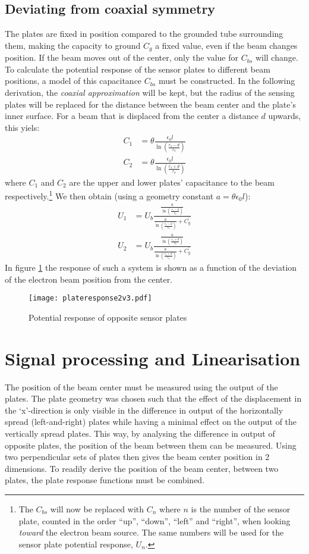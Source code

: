 \subsection{Deviating from coaxial symmetry}
\label{sec:theory/deviating}
The plates are fixed in position compared to the grounded tube surrounding them, making the capacity to ground $C_g$ a fixed value, even if the beam changes position. If the beam moves out of the center, only the value for $C_{bs}$ will change.
To calculate the potential response of the sensor plates to different beam positions, a model of this capacitance $C_{bs}$ must be constructed. 
In the following derivation, the \textit{coaxial approximation} will be kept, but the radius of the sensing plates will be replaced for the distance between the beam center and the plate's inner surface. For a beam that is displaced from the center a distance $d$ upwards, this yiels:
\begin{align}
C_1 &= \theta \frac{\epsilon_0l}{\ln\left(\frac{r_s-d}{r_b}\right)} \\
C_2 &= \theta \frac{\epsilon_0l}{\ln\left(\frac{r_s+d}{r_b}\right)}
\end{align}
where $C_1$ and $C_2$ are the upper and lower plates' capacitance to the beam respectively.\footnote{The $C_{bs}$ will now be replaced with $C_n$ where $n$ is the number of the sensor plate, counted in the order ``up'', ``down'', ``left'' and ``right'', when looking \textit{toward} the electron beam source. The same numbers will be used for the sensor plate potential response, $U_n$.}
We then obtain (using a geometry constant $a=\theta\epsilon_0l$):
\begin{align}
U_1 &= U_b\frac{\frac{a}{\ln\left(\frac{r_s-d}{r_b}\right)}}{\frac{a}{\ln\left(\frac{r_s-d}{r_b}\right)}+C_g^\prime} \\
U_2 &= U_b\frac{\frac{a}{\ln\left(\frac{r_s+d}{r_b}\right)}}{\frac{a}{\ln\left(\frac{r_s+d}{r_b}\right)}+C_g^\prime} \label{eq:plateresponse}
\end{align}
In figure \ref{fig:plateresponse} the response of such a system is shown as a function of the deviation of the electron beam position from the center.
\begin{figure}[hb!]
\centering
\texttt{[image: plateresponse2v3.pdf]}
\caption{Potential response of opposite sensor plates}
\label{fig:plateresponse}
\end{figure}

\newpage
\section{Signal processing and Linearisation}
The position of the beam center must be measured using the output of the plates. The plate geometry was chosen such that the effect of the displacement in the `x'-direction is only visible in the difference in output of the horizontally spread (left-and-right) plates while having a minimal effect on the output of the vertically spread plates. This way, by analysing the difference in output of opposite plates, the position of the beam between them can be measured. Using two perpendicular sets of plates then gives the beam center position in 2 dimensions. 
To readily derive the position of the beam center, between two plates, the plate response functions must be combined.
